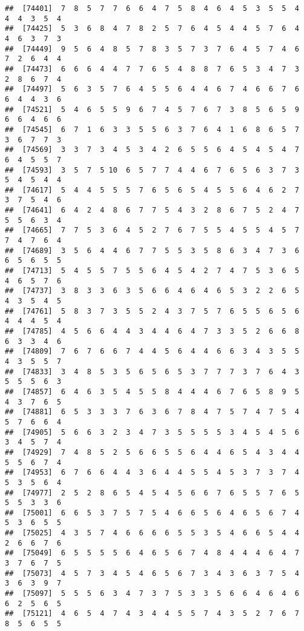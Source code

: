 \documentclass[
]{book}
\begin{document}
\begin{verbatim}
##  [74401]  7  8  5  7  7  6  6  4  7  5  8  4  6  4  5  3  5  5  4  4  4  3  5  4
##  [74425]  5  3  6  8  4  7  8  2  5  7  6  4  5  4  4  5  7  6  4  4  6  3  7  3
##  [74449]  9  5  6  4  8  5  7  8  3  5  7  3  7  6  4  5  7  4  6  7  2  6  4  4
##  [74473]  6  6  6  4  4  7  7  6  5  4  8  8  7  6  5  3  4  7  3  2  8  6  7  4
##  [74497]  5  6  3  5  7  6  4  5  5  6  4  4  6  7  4  6  6  7  6  6  4  4  3  6
##  [74521]  5  4  6  5  5  9  6  7  4  5  7  6  7  3  8  5  6  5  9  6  6  4  6  6
##  [74545]  6  7  1  6  3  3  5  5  6  3  7  6  4  1  6  8  6  5  7  3  6  7  7  3
##  [74569]  3  3  7  3  4  5  3  4  2  6  5  5  6  4  5  4  5  4  7  6  4  5  5  7
##  [74593]  3  5  7  5 10  6  5  7  7  4  4  6  7  6  5  6  3  7  3  5  4  5  4  4
##  [74617]  5  4  4  5  5  5  7  6  5  6  5  4  5  5  6  4  6  2  7  3  7  5  4  6
##  [74641]  6  4  2  4  8  6  7  7  5  4  3  2  8  6  7  5  2  4  7  5  5  6  3  4
##  [74665]  7  7  5  3  6  4  5  2  7  6  7  5  5  4  5  5  4  5  7  7  4  7  6  4
##  [74689]  3  5  6  4  4  6  7  7  5  5  3  5  8  6  3  4  7  3  6  6  5  6  5  5
##  [74713]  5  4  5  5  7  5  5  6  4  5  4  2  7  4  7  5  3  6  5  4  6  5  7  6
##  [74737]  3  8  3  3  6  3  5  6  6  4  6  4  6  5  3  2  2  6  5  4  3  5  4  5
##  [74761]  5  8  3  7  3  5  5  2  4  3  7  5  7  6  5  5  6  5  6  4  4  4  5  4
##  [74785]  4  5  6  6  4  4  3  4  4  6  4  7  3  3  5  2  6  6  8  6  3  3  4  6
##  [74809]  7  6  7  6  6  7  4  4  5  6  4  4  6  6  3  4  3  5  5  4  3  5  5  7
##  [74833]  3  4  8  5  3  5  6  5  6  5  3  7  7  7  3  7  6  4  3  5  5  5  6  3
##  [74857]  6  4  6  3  5  4  5  5  8  4  4  4  6  7  6  5  8  9  5  4  3  7  6  5
##  [74881]  6  5  3  3  3  7  6  3  6  7  8  4  7  5  7  4  7  5  4  5  7  6  6  4
##  [74905]  5  6  6  3  2  3  4  7  3  5  5  5  5  3  4  5  4  5  6  3  4  5  7  4
##  [74929]  7  4  8  5  2  5  6  6  5  5  6  4  4  6  5  4  3  4  4  5  5  6  7  4
##  [74953]  6  7  6  6  4  4  3  6  4  4  5  5  4  5  3  7  3  7  4  5  3  5  6  4
##  [74977]  2  5  2  8  6  5  4  5  4  5  6  6  7  6  5  5  7  6  5  5  5  3  3  6
##  [75001]  6  6  5  3  7  5  7  5  4  6  6  5  6  4  6  5  6  7  4  5  3  6  5  5
##  [75025]  4  3  5  7  4  6  6  6  6  5  5  3  5  4  6  6  5  4  4  2  6  6  7  6
##  [75049]  6  5  5  5  5  6  4  6  5  6  7  4  8  4  4  4  6  4  7  3  7  6  7  5
##  [75073]  4  5  7  3  4  5  4  6  5  6  7  3  4  3  6  3  7  5  4  3  6  3  9  7
##  [75097]  5  5  5  6  3  4  7  3  7  5  3  3  5  6  6  4  6  4  6  6  2  5  6  5
##  [75121]  4  6  5  4  7  4  3  4  4  5  5  7  4  3  5  2  7  6  7  8  5  6  5  5

\end{verbatim}
\end{document}
